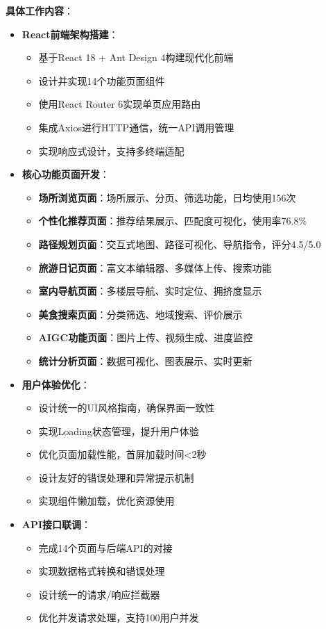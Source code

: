\documentclass[12pt,a4paper]{article}
\begin{document}
\textbf{具体工作内容}：
\begin{itemize}
    \item \textbf{React前端架构搭建}：
    \begin{itemize}
        \item 基于React 18 + Ant Design 4构建现代化前端
        \item 设计并实现14个功能页面组件
        \item 使用React Router 6实现单页应用路由
        \item 集成Axios进行HTTP通信，统一API调用管理
        \item 实现响应式设计，支持多终端适配
    \end{itemize}
    
    \item \textbf{核心功能页面开发}：
    \begin{itemize}
        \item \textbf{场所浏览页面}：场所展示、分页、筛选功能，日均使用156次
        \item \textbf{个性化推荐页面}：推荐结果展示、匹配度可视化，使用率76.8\%
        \item \textbf{路径规划页面}：交互式地图、路径可视化、导航指令，评分4.5/5.0
        \item \textbf{旅游日记页面}：富文本编辑器、多媒体上传、搜索功能
        \item \textbf{室内导航页面}：多楼层导航、实时定位、拥挤度显示
        \item \textbf{美食搜索页面}：分类筛选、地域搜索、评价展示
        \item \textbf{AIGC功能页面}：图片上传、视频生成、进度监控
        \item \textbf{统计分析页面}：数据可视化、图表展示、实时更新
    \end{itemize}
    
    \item \textbf{用户体验优化}：
    \begin{itemize}
        \item 设计统一的UI风格指南，确保界面一致性
        \item 实现Loading状态管理，提升用户体验
        \item 优化页面加载性能，首屏加载时间<2秒
        \item 设计友好的错误处理和异常提示机制
        \item 实现组件懒加载，优化资源使用
    \end{itemize}
    
    \item \textbf{API接口联调}：
    \begin{itemize}
        \item 完成14个页面与后端API的对接
        \item 实现数据格式转换和错误处理
        \item 设计统一的请求/响应拦截器
        \item 优化并发请求处理，支持100用户并发
    \end{itemize}
    

\end{itemize}
\end{document}
